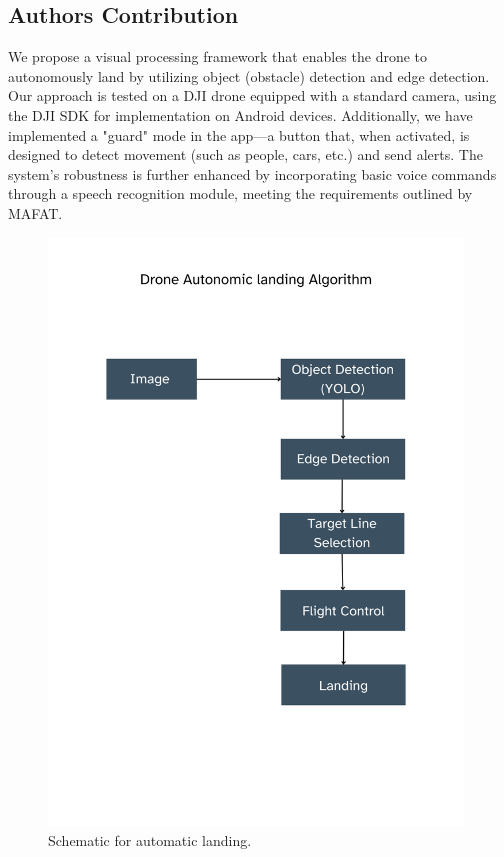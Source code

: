 \documentclass[3p,times]{elsarticle}
\begin{document}
    \subsection{Authors Contribution}
    We propose a visual processing framework that enables the drone to autonomously land by utilizing object (obstacle) detection and edge detection. Our approach is tested on a DJI drone equipped with a standard camera, using the DJI SDK for implementation on Android devices. Additionally, we have implemented a "guard" mode in the app—a button that, when activated, is designed to detect movement (such as people, cars, etc.) and send alerts. The system's robustness is further enhanced by incorporating basic voice commands through a speech recognition module, meeting the requirements outlined by MAFAT.

    \begin{figure}[htp]
        \centering
        \includegraphics[width=11.0cm]{Schematic_for_automatic_landing.png}
        \caption{Schematic for automatic landing.}
        \label{fig:Schematic_for_automatic_landing.}
    \end{figure}
    \\
\end{document}
